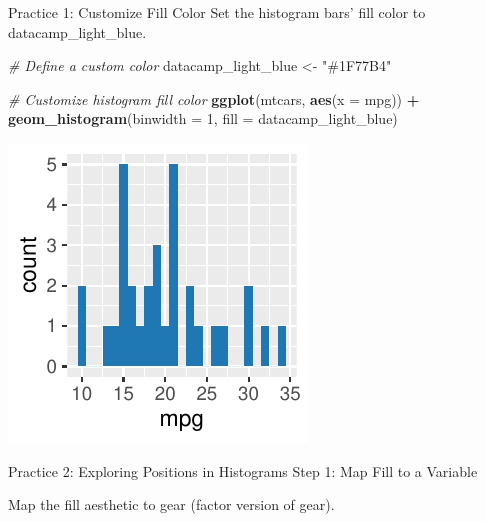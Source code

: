 \documentclass[
  ignorenonframetext,
]{beamer}
\newenvironment{Shaded}{\begin{snugshade}}{\end{snugshade}}
\newcommand{\AttributeTok}[1]{\textcolor[rgb]{0.13,0.29,0.53}{#1}}
\newcommand{\CommentTok}[1]{\textcolor[rgb]{0.56,0.35,0.01}{\textit{#1}}}
\newcommand{\DecValTok}[1]{\textcolor[rgb]{0.00,0.00,0.81}{#1}}
\newcommand{\FunctionTok}[1]{\textcolor[rgb]{0.13,0.29,0.53}{\textbf{#1}}}
\newcommand{\NormalTok}[1]{#1}
\newcommand{\OtherTok}[1]{\textcolor[rgb]{0.56,0.35,0.01}{#1}}
\newcommand{\SpecialCharTok}[1]{\textcolor[rgb]{0.81,0.36,0.00}{\textbf{#1}}}
\newcommand{\StringTok}[1]{\textcolor[rgb]{0.31,0.60,0.02}{#1}}
\begin{document}
\begin{frame}[fragile]{Practice 1: Customize Fill Color}
\label{practice-1-customize-fill-color}
Set the histogram bars' fill color to datacamp\_light\_blue.


\begin{Shaded}
\begin{Highlighting}[]
\CommentTok{\# Define a custom color}
\NormalTok{datacamp\_light\_blue }\OtherTok{\textless{}{-}} \StringTok{"\#1F77B4"}

\CommentTok{\# Customize histogram fill color}
\FunctionTok{ggplot}\NormalTok{(mtcars, }\FunctionTok{aes}\NormalTok{(}\AttributeTok{x =}\NormalTok{ mpg)) }\SpecialCharTok{+} \FunctionTok{geom\_histogram}\NormalTok{(}\AttributeTok{binwidth =} \DecValTok{1}\NormalTok{, }\AttributeTok{fill =}\NormalTok{ datacamp\_light\_blue)}
\end{Highlighting}
\end{Shaded}

\begin{center}\includegraphics[width=0.5\linewidth]{Figs/unnamed-chunk-40-1} \end{center}
\end{frame}

\begin{frame}{Practice 2: Exploring Positions in Histograms}
\label{practice-2-exploring-positions-in-histograms}
Step 1: Map Fill to a Variable

Map the fill aesthetic to gear (factor version of gear).
\end{frame}
\end{document}
